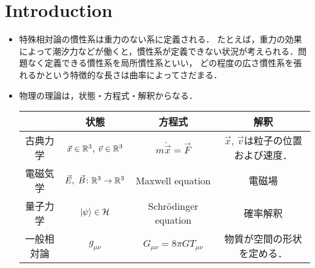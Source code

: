 \section{Introduction}
\begin{itemize}
	\item 特殊相対論の慣性系は重力のない系に定義される．
	たとえば，重力の効果によって潮汐力などが働くと，慣性系が定義できない状況が考えられる．問題なく定義できる慣性系を局所慣性系といい，
	どの程度の広さ慣性系を張れるかという特徴的な長さは曲率によってさだまる．
	\item 物理の理論は，状態・方程式・解釈からなる．
	\begin{table}[htbp]
		\centering
		\begin{tabular}{c|ccc}
		 & 状態 & 方程式 & 解釈 \\\hline
		 古典力学 & $\vec{x}\in\mathbb{R}^3$, $\vec{v}\in\mathbb{R}^3$ & $m\ddot{\vec{x}} = \vec{F}$ & $\vec{x}$, $\vec{v}$は粒子の位置および速度．\\
		 電磁気学 & $\vec{E},\ \vec{B}\colon\R^3 \to \R^3$ & Maxwell equation & 電磁場\\
		 量子力学 & $\ket{\psi}\in\mathcal{H}$ & Schr\"{o}dinger equation & 確率解釈\\
		 一般相対論 & $g_{\mu\nu}$ & $G_{\mu\nu} = 8\pi G T_{\mu\nu}$ & 物質が空間の形状を定める．
		\end{tabular}
	\end{table} 
\end{itemize}
